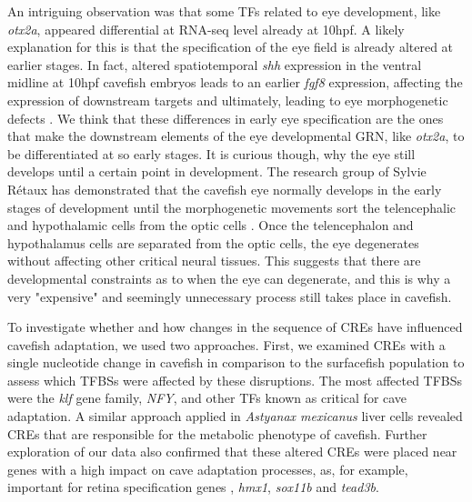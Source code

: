 An intriguing observation was that some TFs related to eye development, like \textit{otx2a}, appeared differential at RNA-seq level already at 10hpf. A likely explanation for this is that the specification of the eye field is already altered at earlier stages. In fact, altered spatiotemporal \textit{shh} expression in the ventral midline at 10hpf cavefish embryos leads to an earlier \textit{fgf8} expression, affecting the expression of downstream targets and ultimately, leading to eye morphogenetic defects \parencite{pottin_restoring_2011}. We think that these differences in early eye specification are the ones that make the downstream elements of the eye developmental GRN, like \textit{otx2a}, to be differentiated at so early stages. It is curious though, why the eye still develops until a certain point in development. The research group of Sylvie Rétaux has demonstrated that the cavefish eye normally develops in the early stages of development until the morphogenetic movements sort the telencephalic and hypothalamic cells from the optic cells \parencite{pottin_restoring_2011, devos_eye_2021}. Once the telencephalon and hypothalamus cells are separated from the optic cells, the eye degenerates without affecting other critical neural tissues. This suggests that there are developmental constraints as to when the eye can degenerate, and this is why a very "expensive" and seemingly unnecessary process still takes place in cavefish.


To investigate whether and how changes in the sequence of CREs have influenced cavefish adaptation, we used two approaches. First, we examined CREs with a single nucleotide change in cavefish in comparison to the surfacefish population to assess which TFBSs were affected by these disruptions. The most affected TFBSs were the \textit{klf} gene family, \textit{NFY}, and other TFs known as critical for cave adaptation. A similar approach applied in \textit{Astyanax mexicanus} liver cells \parencite{krishnan_genome-wide_2022} revealed CREs that are responsible for the metabolic phenotype of cavefish. Further exploration of our data also confirmed that these altered CREs were placed near genes with a high impact on cave adaptation processes, as, for example, important for retina specification genes \parencite{buono_analysis_2021}, \textit{hmx1}, \textit{sox11b} and \textit{tead3b}.

